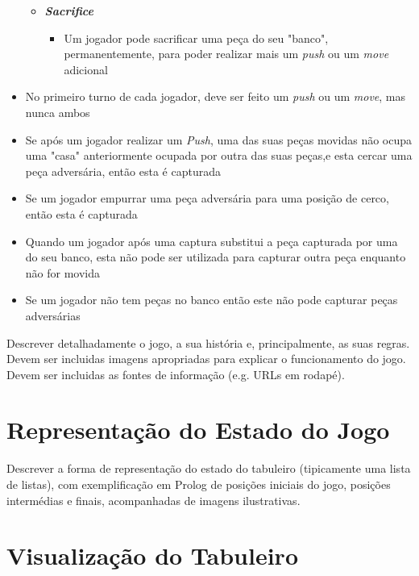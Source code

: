 \documentclass[a4paper]{article}
\begin{document}
\begin{itemize}
\begin{itemize}
\begin{itemize}
				\end{itemize}
				\item[] \textbf{\textit{Sacrifice}}
				\begin{itemize}
					\item Um jogador pode sacrificar uma peça do seu "banco", permanentemente, para poder realizar mais um \textit{push} ou um \textit{move} adicional
				\end{itemize}
			\end{itemize}
	\item No primeiro turno de cada jogador, deve ser feito um \textit{push} ou um \textit{move}, mas nunca ambos
	\item Se após um jogador realizar um \textit{Push}, uma das suas peças movidas não ocupa uma "casa" anteriormente ocupada por outra das suas peças,e esta cercar uma peça adversária, então esta é capturada
	\item Se um jogador empurrar uma peça adversária para uma posição de cerco, então esta é capturada
	\item Quando um jogador após uma captura substitui a peça capturada por uma do seu banco, esta não pode ser utilizada para capturar outra peça enquanto não for movida
	\item Se um jogador não tem peças no banco então este não pode capturar peças adversárias
\end{itemize}

Descrever detalhadamente o jogo, a sua história e, principalmente, as suas regras.
Devem ser incluidas imagens apropriadas para explicar o funcionamento do jogo.
Devem ser incluidas as fontes de informação (e.g. URLs em rodapé).


\section{Representação do Estado do Jogo}

Descrever a forma de representação do estado do tabuleiro (tipicamente uma lista de listas), com exemplificação em Prolog de posições iniciais do jogo, posições intermédias e finais, acompanhadas de imagens ilustrativas.


\section{Visualização do Tabuleiro}
\end{document}
